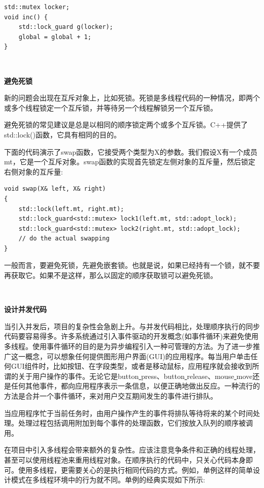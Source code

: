 \begin{lstlisting}[caption={}]
std::mutex locker;
void inc() {
	std::lock_guard g(locker);
	global = global + 1;
}
\end{lstlisting}

\noindent\textbf{}\ \par
\textbf{避免死锁} \ \par
新的问题会出现在互斥对象上，比如死锁。死锁是多线程代码的一种情况，即两个或多个线程锁定一个互斥锁，并等待另一个线程解锁另一个互斥锁。 \par
避免死锁的常见建议是总是以相同的顺序锁定两个或多个互斥锁。C++提供了std::lock()函数，它具有相同的目的。 \par
下面的代码演示了swap函数，它接受两个类型为X的参数。我们假设X有一个成员mt，它是一个互斥对象。swap函数的实现首先锁定左侧对象的互斥量，然后锁定右侧对象的互斥量: \par

\begin{lstlisting}[caption={}]
void swap(X& left, X& right)
{
	std::lock(left.mt, right.mt);
	std::lock_guard<std::mutex> lock1(left.mt, std::adopt_lock);
	std::lock_guard<std::mutex> lock2(right.mt, std::adopt_lock);
	// do the actual swapping
}
\end{lstlisting}

一般而言，要避免死锁，先避免嵌套锁。也就是说，如果已经持有一个锁，就不要再获取它。如果不是这样，那么以固定的顺序获取锁可以避免死锁。 \par

\noindent\textbf{}\ \par
\textbf{设计并发代码} \ \par
当引入并发后，项目的复杂性会急剧上升。与并发代码相比，处理顺序执行的同步代码要容易得多。许多系统通过引入事件驱动的开发概念(如事件循环)来避免使用多线程。使用事件循环的目的是为异步编程引入一种可管理的方法。为了进一步推广这一概念，可以想象任何提供图形用户界面(GUI)的应用程序。每当用户单击任何GUI组件时，比如按钮、在字段类型，或者是移动鼠标，应用程序就会接收到所谓的关于用户操作的事件。无论它是button\underline{ }press、button\underline{ }release、mouse\underline{ }move还是任何其他事件，都向应用程序表示一条信息，以便正确地做出反应。一种流行的方法是合并一个事件循环，来对用户交互期间发生的事件进行排队。 \par
当应用程序忙于当前任务时，由用户操作产生的事件将排队等待将来的某个时间处理。处理过程包括调用附加到每个事件的处理函数，它们按放入队列的顺序被调用。 \par
在项目中引入多线程会带来额外的复杂性。应该注意竞争条件和正确的线程处理，甚至可以使用线程池来重用线程对象。在顺序执行的代码中，只关心代码本身即可。使用多线程，更需要关心的是执行相同代码的方式。例如，单例这样的简单设计模式在多线程环境中的行为就不同。单例的经典实现如下所示: \par

